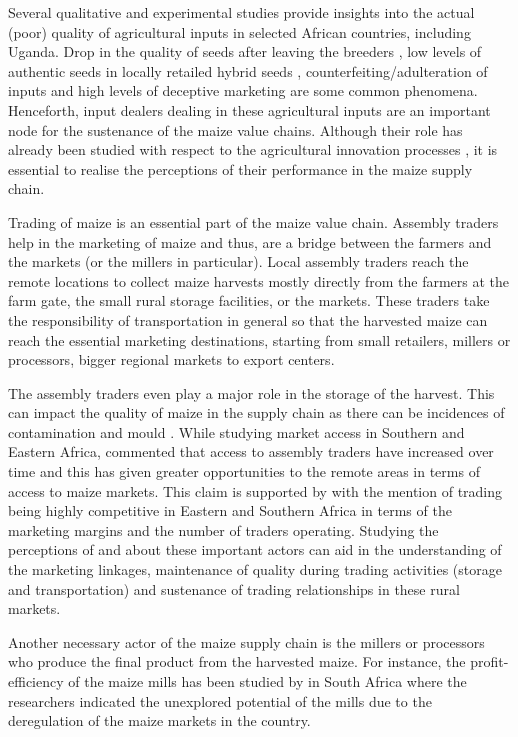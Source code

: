 \documentclass[12pt,english]{article}\usepackage[]{graphicx}\usepackage[]{color}
\begin{document}
\begin{onehalfspace}
Several qualitative and experimental studies \citep{Ashour2019,Boef2019,Barriga2018,Bold2017}
provide insights into the actual (poor) quality of agricultural inputs
in selected African countries, including Uganda. Drop in the quality
of seeds after leaving the breeders \citep{Barriga2018}, low levels
of authentic seeds in locally retailed hybrid seeds \citep{Bold2017},
counterfeiting/adulteration of inputs \citep{Ashour2019,Boef2019}
and high levels of deceptive marketing \citep{Ashour2019} are some
common phenomena. Henceforth, input dealers dealing in these agricultural
inputs are an important node for the sustenance of the maize value
chains. Although their role has already been studied with respect
to the agricultural innovation processes \citep{Etyang2014,Odame2011,Chinsinga2011,Feder2011,Adhiguru2009},
it is essential to realise the perceptions of their performance in
the maize supply chain. 

Trading of maize is an essential part of the maize value chain. Assembly
traders help in the marketing of maize and thus, are a bridge between
the farmers and the markets (or the millers in particular). Local
assembly traders reach the remote locations to collect maize harvests
mostly directly from the farmers at the farm gate, the small rural
storage facilities, or the markets. These traders take the responsibility
of transportation in general so that the harvested maize can reach
the essential marketing destinations, starting from small retailers,
millers or processors, bigger regional markets to export centers. 

The assembly traders even play a major role in the storage of the
harvest. This can impact the quality of maize in the supply chain
as there can be incidences of contamination and mould \citep{Kaaya2006}.
While studying market access in Southern and Eastern Africa, \citet{Mather2013}
commented that access to assembly traders have increased over time
and this has given greater opportunities to the remote areas in terms
of access to maize markets. This claim is supported by \citet{Sitko2014}
with the mention of trading being highly competitive in Eastern and
Southern Africa in terms of the marketing margins and the number of
traders operating. Studying the perceptions of and about these important
actors can aid in the understanding of the marketing linkages, maintenance
of quality during trading activities (storage and transportation)
and sustenance of trading relationships in these rural markets. 

Another necessary actor of the maize supply chain is the millers or
processors who produce the final product from the harvested maize.
For instance, the profit-efficiency of the maize mills has been studied
by \citet{Abu2009} in South Africa where the researchers indicated
the unexplored potential of the mills due to the deregulation of the
maize markets in the country. 


\end{onehalfspace}
\end{document}
